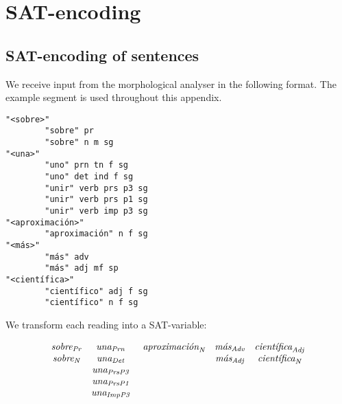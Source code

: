 \def\sobre{\text{\em sobre}}
\def\una{\text{\em una}}
\def\mas{\text{\em m\'{a}s}}
\def\cientifica{\text{\em cient\'{\i}fica}}
\def\aproximacion{\text{ \em aproximaci\'{o}n}}


\def\vPrsPThree{\text{\em PrsP3}}
\def\vPrsPOne{\text{\em PrsP1}}
\def\vImpPThree{\text{\em ImpP3}}
\def\adj{{\text{\em Adj}}}
\def\adv{{\text{\em Adv}}}
\def\n{\text{\em N}}
\def\pr{{\text{\em Pr}}}
\def\prn{{\text{\em Prn}}}
\def\det{{\text{\em Det}}}


\def\sobrePr{\sobre_\pr}
\def\sobreN{\sobre_\n}
\def\unaPrn{\una_\prn}
\def\unaDet{\una_\det}
\def\unaPrsPThree{\una_\vPrsPThree}
\def\unaPrsPOne{\una_\vPrsPOne}
\def\unaImp{\una_\vImpPThree}
\def\aproximacionN{\aproximacion_\n}
\def\masAdv{\mas_\adv}
\def\masAdj{\mas_\adj}
\def\cientificaAdj{\cientifica_\adj}
\def\cientificaN{\cientifica_\n}

\def\cgrule#1{\noindent {\sc \bf #1 }}

\appendix
\chapter{SAT-encoding}

\section{SAT-encoding of sentences}

We receive input from the morphological analyser in the following format.
The example segment is used throughout this appendix.

\begin{verbatim}
"<sobre>"
        "sobre" pr
        "sobre" n m sg
"<una>"
        "uno" prn tn f sg
        "uno" det ind f sg
        "unir" verb prs p3 sg
        "unir" verb prs p1 sg
        "unir" verb imp p3 sg
"<aproximación>"
        "aproximación" n f sg
"<más>"
        "más" adv
        "más" adj mf sp
"<científica>"
        "científico" adj f sg
        "científico" n f sg
\end{verbatim}

We transform each reading into a SAT-variable:


\begin{equation}
\begin{array}{c c c c c}
\sobrePr & \unaPrn & \aproximacionN & \masAdv & \cientificaAdj \\
\sobreN  & \unaDet &                & \masAdj & \cientificaN \\
         & \unaPrsPThree \\
         & \unaPrsPOne \\
         & \unaImp \\
\end{array}
\end{equation}

